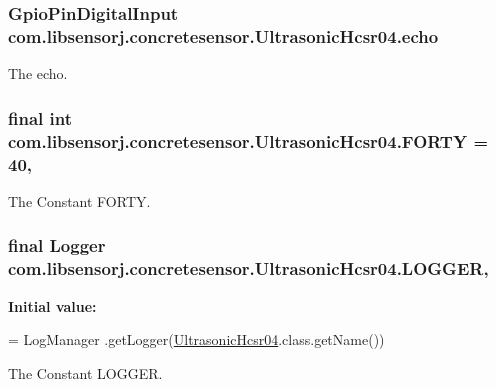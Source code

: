 \subsubsection[{echo}]{\setlength{\rightskip}{0pt plus 5cm}Gpio\+Pin\+Digital\+Input com.\+libsensorj.\+concretesensor.\+Ultrasonic\+Hcsr04.\+echo\hspace{0.3cm}{\ttfamily [private]}}\label{classcom_1_1libsensorj_1_1concretesensor_1_1UltrasonicHcsr04_a3695a560e3157a5e6f7896532d717456}
The echo. \hypertarget{classcom_1_1libsensorj_1_1concretesensor_1_1UltrasonicHcsr04_a7106eaa9f89d876a4749d502232964df}{}
\subsubsection[{F\+O\+R\+T\+Y}]{\setlength{\rightskip}{0pt plus 5cm}final int com.\+libsensorj.\+concretesensor.\+Ultrasonic\+Hcsr04.\+F\+O\+R\+T\+Y = 40\hspace{0.3cm}{\ttfamily [static]}, {\ttfamily [private]}}\label{classcom_1_1libsensorj_1_1concretesensor_1_1UltrasonicHcsr04_a7106eaa9f89d876a4749d502232964df}
The Constant F\+O\+R\+T\+Y. \hypertarget{classcom_1_1libsensorj_1_1concretesensor_1_1UltrasonicHcsr04_a9a3534d952f2668b69b0888b9e929abb}{}
\subsubsection[{L\+O\+G\+G\+E\+R}]{\setlength{\rightskip}{0pt plus 5cm}final Logger com.\+libsensorj.\+concretesensor.\+Ultrasonic\+Hcsr04.\+L\+O\+G\+G\+E\+R\hspace{0.3cm}{\ttfamily [static]}, {\ttfamily [private]}}\label{classcom_1_1libsensorj_1_1concretesensor_1_1UltrasonicHcsr04_a9a3534d952f2668b69b0888b9e929abb}
{\bfseries Initial value\+:}
\begin{DoxyCode}
= LogManager
            .getLogger(\hyperlink{classcom_1_1libsensorj_1_1concretesensor_1_1UltrasonicHcsr04_a7e02068d9acb1b3cf1d15d45afbf377b}{UltrasonicHcsr04}.class.getName())
\end{DoxyCode}
The Constant L\+O\+G\+G\+E\+R. \hypertarget{classcom_1_1libsensorj_1_1concretesensor_1_1UltrasonicHcsr04_aad32f417f9106fa8f3f2e2a7416f033b}{}
